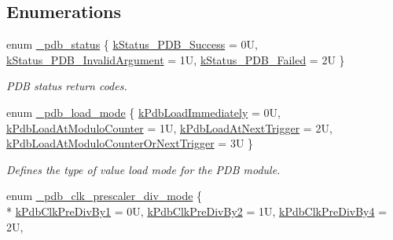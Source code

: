 \subsection*{Enumerations}
\begin{DoxyCompactItemize}
\item 
enum \hyperlink{group__pdb__hal_gaa17da678ec0a92f7c1dd0dfa2a58717f}{\+\_\+pdb\+\_\+status} \{ \hyperlink{group__pdb__hal_ggaa17da678ec0a92f7c1dd0dfa2a58717fa6fe6047b626a61c7f0ba70c251b66f0d}{k\+Status\+\_\+\+P\+D\+B\+\_\+\+Success} = 0U, 
\hyperlink{group__pdb__hal_ggaa17da678ec0a92f7c1dd0dfa2a58717faed731bf434c59c6376549d7cd5919888}{k\+Status\+\_\+\+P\+D\+B\+\_\+\+Invalid\+Argument} = 1U, 
\hyperlink{group__pdb__hal_ggaa17da678ec0a92f7c1dd0dfa2a58717fad120bd1f770605f5c7f73f23cd6ceba3}{k\+Status\+\_\+\+P\+D\+B\+\_\+\+Failed} = 2U
 \}\begin{DoxyCompactList}\small\item\em P\+DB status return codes. \end{DoxyCompactList}
\item 
enum \hyperlink{group__pdb__hal_ga24cd30e248ca866cb85a353b2c69ac65}{\+\_\+pdb\+\_\+load\+\_\+mode} \{ \hyperlink{group__pdb__hal_gga24cd30e248ca866cb85a353b2c69ac65a0426c87a5f64ded022bdc050cf1c2310}{k\+Pdb\+Load\+Immediately} = 0U, 
\hyperlink{group__pdb__hal_gga24cd30e248ca866cb85a353b2c69ac65aaa293dc9deca57e1aeae40e634a08365}{k\+Pdb\+Load\+At\+Modulo\+Counter} = 1U, 
\hyperlink{group__pdb__hal_gga24cd30e248ca866cb85a353b2c69ac65ac5681120208e96a265d73b243cca3702}{k\+Pdb\+Load\+At\+Next\+Trigger} = 2U, 
\hyperlink{group__pdb__hal_gga24cd30e248ca866cb85a353b2c69ac65a4f31f7acd4f40c22fcb37911906c62d3}{k\+Pdb\+Load\+At\+Modulo\+Counter\+Or\+Next\+Trigger} = 3U
 \}\begin{DoxyCompactList}\small\item\em Defines the type of value load mode for the P\+DB module. \end{DoxyCompactList}
\item 
enum \hyperlink{group__pdb__hal_gaf0f364ab5a47793544fdd1b60438a1ef}{\+\_\+pdb\+\_\+clk\+\_\+prescaler\+\_\+div\+\_\+mode} \{ \\*
\hyperlink{group__pdb__hal_ggaf0f364ab5a47793544fdd1b60438a1efa6bf562905ca594c518454501697f419a}{k\+Pdb\+Clk\+Pre\+Div\+By1} = 0U, 
\hyperlink{group__pdb__hal_ggaf0f364ab5a47793544fdd1b60438a1efa5e1cff952ec04b21b17b4b639f635557}{k\+Pdb\+Clk\+Pre\+Div\+By2} = 1U, 
\hyperlink{group__pdb__hal_ggaf0f364ab5a47793544fdd1b60438a1efa46c4ef05ee4ea0510bfe4152aaa74a4d}{k\+Pdb\+Clk\+Pre\+Div\+By4} = 2U, 

\end{DoxyCompactItemize}
